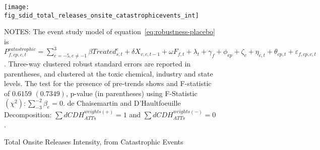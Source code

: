 \begin{figure}[H]
    \centering
    \texttt{[image: fig\_sdid\_total\_releases\_onsite\_catastrophicevents\_int]}
    \caption{Total Onsite Releases Intensity, from Catastrophic Events}
    \label{fig:baseline-placebo}
    \begin{minipage}{\columnwidth}
        \vspace{0.05in}
        \tiny NOTES: The event study model of equation~\ref{eq:robustness-placebo} is $P_{f,cp,c,t}^{catastrophic} = \sum_{{e = -5},{e \neq -1}}^{3}\beta Treated_{s,t}^e + \delta X_{v,c,t-1} + \omega F_{f,t} + \lambda_{t} + \gamma_{f} + \phi_{cp} + \zeta_{c} + \eta_{c,t} + \theta_{cp,t} + \varepsilon_{f,cp,c,t}$. Three-way clustered robust standard errors are reported in parentheses, and clustered at the toxic chemical, industry and state levels. The test for the presence of pre-trends shows and F-statistic of $0.6159$ $(0.7349)$, p-value (in parentheses) using F-Statistic $(\chi^2): \sum_{-3}^{-2} \beta_{e} = 0$. de Chaisemartin and D'Haultfoeuille Decomposition: $\sum dCDH_{ATTs}^{weights(+)} = 1$ and $\sum dCDH_{ATTs}^{weights(-)} = 0$.
    \end{minipage}
\end{figure}
